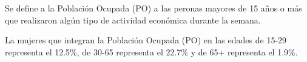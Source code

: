 Se define a la Población Ocupada (PO) a las peronas mayores de 15 años o más que realizaron algún tipo de actividad económica durante la semana. 

La mujeres que integran la Población Ocupada (PO) en las edades de 15-29 representa el 12.5\%, de 30-65 representa el 22.7\% y de 65+ representa el 1.9\%.